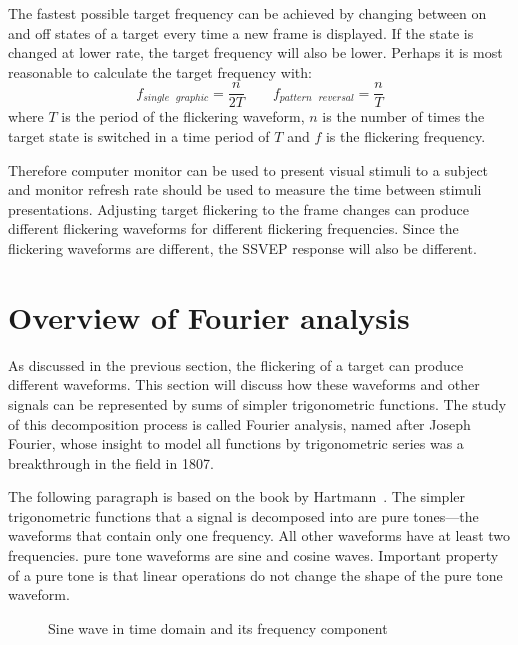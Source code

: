 The fastest possible target frequency can be achieved by changing between on and off \glspl{state} of a target every time a new \gls{frame} is displayed. If the \gls{state} is changed at lower rate, the \gls{target} frequency will also be lower. Perhaps it is most reasonable to calculate the \gls{target} frequency with:
\begin{equation}
	f_{single\mbox{ }graphic} = \frac{n}{2T} \qquad f_{pattern\mbox{ }reversal} = \frac{n}{T}
\end{equation}
where $T$ is the period of the \gls{flickering waveform}, $n$ is the number of times the \gls{target} \gls{state} is switched in a time period of $T$ and $f$ is the \gls{flickering} frequency.

Therefore computer monitor can be used to present visual stimuli to a subject and monitor \gls{refresh rate} should be used to measure the time between stimuli presentations. Adjusting \gls{target} \gls{flickering} to the \gls{frame} changes can produce different \glspl{flickering waveform} for different \gls{flickering} frequencies. Since the \glspl{flickering waveform} are different, the \gls{SSVEP} response will also be different.

\section{Overview of Fourier analysis}
\label{sec:fourier}

As discussed in the previous section, the \gls{flickering} of a \gls{target} can produce different waveforms. This section will discuss how these waveforms and other signals can be represented by sums of simpler trigonometric functions. The study of this decomposition process is called Fourier analysis, named after Joseph Fourier, whose insight to model all functions by trigonometric series was a breakthrough in the field in 1807.

The following paragraph is based on the book by Hartmann~\cite{pure_tone}. The simpler trigonometric functions that a signal is decomposed into are \glspl{pure tone}---the waveforms that contain only one frequency. All other waveforms have at least two frequencies. \Gls{pure tone} waveforms are sine and cosine waves. Important property of a \gls{pure tone} is that linear operations do not change the shape of the \gls{pure tone} waveform.

\begin{figure}[h]
	
	\caption{Sine wave in time domain and its frequency component}
\end{figure}

